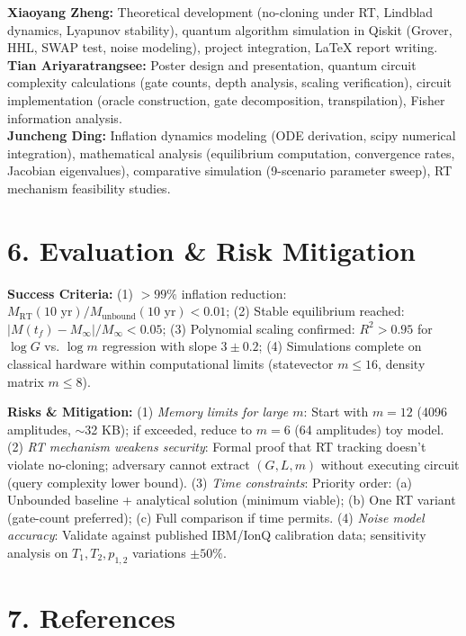 \documentclass[a4paper,11pt,twoside]{article}
\begin{document}
\textbf{Xiaoyang Zheng:} Theoretical development (no-cloning under RT, Lindblad dynamics, Lyapunov stability), quantum algorithm simulation in Qiskit (Grover, HHL, SWAP test, noise modeling), project integration, LaTeX report writing. \\
\textbf{Tian Ariyaratrangsee:} Poster design and presentation, quantum circuit complexity calculations (gate counts, depth analysis, scaling verification), circuit implementation (oracle construction, gate decomposition, transpilation), Fisher information analysis. \\
\textbf{Juncheng Ding:} Inflation dynamics modeling (ODE derivation, scipy numerical integration), mathematical analysis (equilibrium computation, convergence rates, Jacobian eigenvalues), comparative simulation (9-scenario parameter sweep), RT mechanism feasibility studies.

\vspace{-4pt}
\section*{6. Evaluation \& Risk Mitigation}
\vspace{-4pt}

\textbf{Success Criteria:} (1) $>99\%$ inflation reduction: $M_{\text{RT}}(10\text{ yr})/M_{\text{unbound}}(10\text{ yr}) < 0.01$; (2) Stable equilibrium reached: $|M(t_f) - M_{\infty}|/M_{\infty} < 0.05$; (3) Polynomial scaling confirmed: $R^2 > 0.95$ for $\log G$ vs. $\log m$ regression with slope $3 \pm 0.2$; (4) Simulations complete on classical hardware within computational limits (statevector $m \leq 16$, density matrix $m \leq 8$).

\textbf{Risks \& Mitigation:} (1) \textit{Memory limits for large $m$}: Start with $m=12$ (4096 amplitudes, $\sim$32 KB); if exceeded, reduce to $m=6$ (64 amplitudes) toy model. (2) \textit{RT mechanism weakens security}: Formal proof that RT tracking doesn't violate no-cloning; adversary cannot extract $(G,L,m)$ without executing circuit (query complexity lower bound). (3) \textit{Time constraints}: Priority order: (a) Unbounded baseline + analytical solution (minimum viable); (b) One RT variant (gate-count preferred); (c) Full comparison if time permits. (4) \textit{Noise model accuracy}: Validate against published IBM/IonQ calibration data; sensitivity analysis on $T_1, T_2, p_{1,2}$ variations $\pm 50\%$.

\vspace{-4pt}
\section*{7. References}
\vspace{-4pt}
\end{document}
